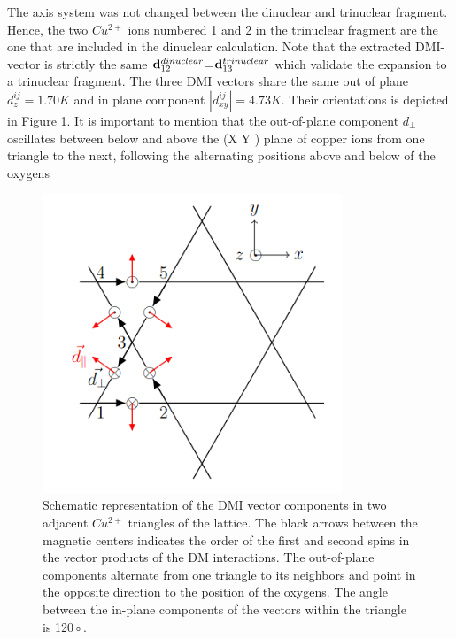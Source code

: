 \documentclass[12pt]{report}
\numberwithin{equation}{section}
\begin{document}
The axis system was not changed between the dinuclear and trinuclear fragment. 
Hence, the two $Cu^{2+}$ ions numbered 1 and 2 in the trinuclear fragment are the one that are included in the dinuclear calculation.
Note that the extracted DMI-vector is strictly the same $\vb{d}_{12}^{dinuclear}$=$\vb{d}_{13}^{trinuclear}$ which validate the expansion to a trinuclear fragment.
The three DMI vectors share the same out of plane $d_z^{ij}=1.70K$ and in plane component $|d_{xy}^{ij}|=4.73K$.
Their orientations is depicted in Figure \ref{fig:schemaDMI}.
It is important to mention that the out-of-plane component $d_{\perp}$ oscillates between below and above the (X Y ) plane of copper ions from one triangle to the next, following the alternating positions above and below of the oxygens
\begin{figure}[!ht]
    \centering
    \includegraphics[width=0.8\textwidth]{Images/SchemaDMI.png}
    \caption[Schematic representation of the DMI vector components in two adjacent $Cu^{2+}$ triangles of the lattice.]{Schematic representation of the DMI vector components in two adjacent $Cu^{2+}$ triangles of the lattice. The black arrows
    between the magnetic centers indicates the order of the first and second spins in the
    vector products of the DM interactions. The out-of-plane components alternate from
    one triangle to its neighbors and point in the opposite direction to the position of
    the oxygens. The angle between the in-plane components of the vectors within the
    triangle is 120◦. }
    \label{fig:schemaDMI}
\end{figure}
\end{document}
